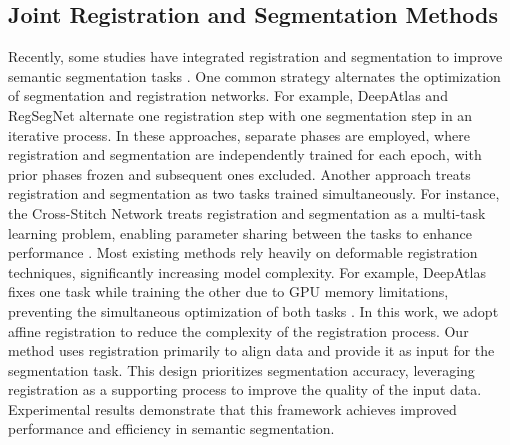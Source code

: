 \subsection{Joint Registration and Segmentation Methods}
Recently, some studies have integrated registration and segmentation to improve semantic segmentation tasks \cite{elmahdy2021joint, xu2019deepatlas, pohl2006bayesian, pham2024regsegnet}. One common strategy alternates the optimization of segmentation and registration networks. For example, DeepAtlas \cite{xu2019deepatlas} and RegSegNet \cite{pham2024regsegnet} alternate one registration step with one segmentation step in an iterative process. In these approaches, separate phases are employed, where registration and segmentation are independently trained for each epoch, with prior phases frozen and subsequent ones excluded.
Another approach treats registration and segmentation as two tasks trained simultaneously. For instance, the Cross-Stitch Network treats registration and segmentation as a multi-task learning problem, enabling parameter sharing between the tasks to enhance performance \cite{elmahdy2021joint}. Most existing methods rely heavily on deformable registration techniques, significantly increasing model complexity. For example, DeepAtlas fixes one task while training the other due to GPU memory limitations, preventing the simultaneous optimization of both tasks \cite{xu2019deepatlas}.
In this work, we adopt affine registration to reduce the complexity of the registration process. Our method uses registration primarily to align data and provide it as input for the segmentation task. This design prioritizes segmentation accuracy, leveraging registration as a supporting process to improve the quality of the input data. Experimental results demonstrate that this framework achieves improved performance and efficiency in semantic segmentation.